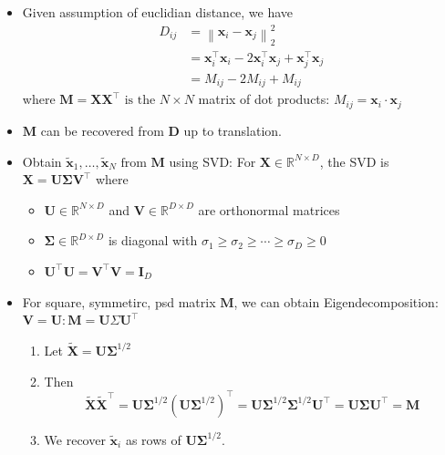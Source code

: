 \documentclass[11pt, %
	oneside, %
	english, %
	onehalfspacing, %
	parskip, %
	]{article} %
\theoremstyle{definition}
\begin{document}
\begin{itemize}
	\item Given assumption of euclidian distance, we have
	\begin{align*}
		D_{i j} & =\left\|\mathbf{x}_i-\mathbf{x}_j\right\|_2^2 \\
		& =\mathbf{x}_i^{\top} \mathbf{x}_i-2 \mathbf{x}_i^{\top} \mathbf{x}_j+\mathbf{x}_j^{\top} \mathbf{x}_j \\
		& =M_{i j}-2 M_{i j}+M_{i j}
	\end{align*}
	where $\mathbf{M}=\mathbf{X} \mathbf{X}^{\top} \text { is the } N \times N$ matrix of dot products: $M_{i j}=\mathbf{x}_i \cdot \mathbf{x}_j$
	\item $\mathbf{M}$ can be recovered from $\mathbf{D}$ up to translation.
	\item Obtain $\tilde{\mathbf{x}}_1, \ldots, \tilde{\mathbf{x}}_N \text { from } \mathbf{M}$ using SVD: For $\mathbf{X} \in \mathbb{R}^{N \times D}$, the SVD is $\mathbf{X}=\mathbf{U} \boldsymbol{\Sigma} \mathbf{V}^{\top}$ where
	\begin{itemize}
		\item $\mathbf{U} \in \mathbb{R}^{N \times D}$ and $\mathbf{V} \in \mathbb{R}^{D \times D}$ are orthonormal matrices
		\item $\boldsymbol{\Sigma} \in \mathbb{R}^{D \times D}$ is diagonal with $\sigma_1 \geq \sigma_2 \geq \cdots \geq \sigma_D \geq 0$
		\item $\mathbf{U}^{\top} \mathbf{U}=\mathbf{V}^{\top} \mathbf{V}=\mathbf{I}_D$
	\end{itemize}
	\item  For square, symmetirc, psd matrix $\mathbf{M}$, we can obtain Eigendecomposition: $\mathbf{V}=\mathbf{U}: \mathbf{M}=\mathbf{U} \Sigma \mathbf{U}^{\top}$
	\begin{enumerate}
		\item Let $\tilde{\mathbf{X}}=\mathbf{U} \boldsymbol{\Sigma}^{1 / 2}$
		\item Then
		$$
		\tilde{\mathbf{X}} \tilde{\mathbf{X}}^{\top}=\mathbf{U} \boldsymbol{\Sigma}^{1 / 2}\left(\mathbf{U} \boldsymbol{\Sigma}^{1 / 2}\right)^{\top}=\mathbf{U} \boldsymbol{\Sigma}^{1 / 2} \boldsymbol{\Sigma}^{1 / 2} \mathbf{U}^{\top}=\mathbf{U} \boldsymbol{\Sigma} \mathbf{U}^{\top}=\mathbf{M}
		$$
		\item We recover $\tilde{\mathbf{x}}_i$ as rows of $\mathbf{U} \boldsymbol{\Sigma}^{1 / 2}$.
	\end{enumerate}
\end{itemize}
\end{document}
